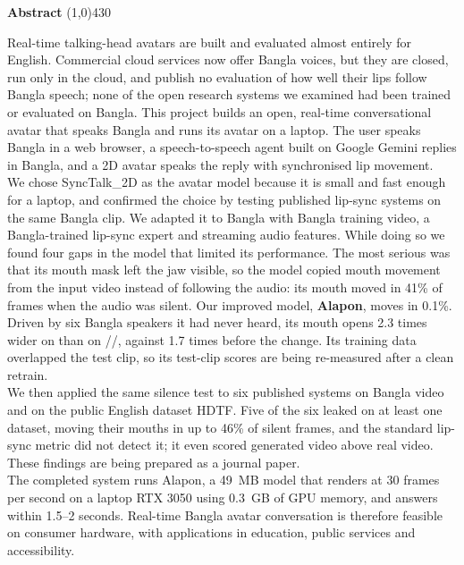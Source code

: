 \setlength{\headheight}{14pt}
\begin{center}
	{\huge \bf Abstract}
	\line(1,0){430}
\end{center}

Real-time talking-head avatars are built and evaluated almost entirely for English. Commercial cloud services now offer Bangla voices, but they are closed, run only in the cloud, and publish no evaluation of how well their lips follow Bangla speech; none of the open research systems we examined had been trained or evaluated on Bangla. This project builds an open, real-time conversational avatar that speaks Bangla and runs its avatar on a laptop. The user speaks Bangla in a web browser, a speech-to-speech agent built on Google Gemini replies in Bangla, and a 2D avatar speaks the reply with synchronised lip movement.\\

\noindent
We chose SyncTalk\_2D as the avatar model because it is small and fast enough for a laptop, and confirmed the choice by testing published lip-sync systems on the same Bangla clip. We adapted it to Bangla with Bangla training video, a Bangla-trained lip-sync expert and streaming audio features. While doing so we found four gaps in the model that limited its performance. The most serious was that its mouth mask left the jaw visible, so the model copied mouth movement from the input video instead of following the audio: its mouth moved in 41\% of frames when the audio was silent. Our improved model, \textbf{Alapon}, moves in 0.1\%. Driven by six Bangla speakers it had never heard, its mouth opens 2.3 times wider on  than on //, against 1.7 times before the change. Its training data overlapped the test clip, so its test-clip scores are being re-measured after a clean retrain.\\

\noindent
We then applied the same silence test to six published systems on Bangla video and on the public English dataset HDTF. Five of the six leaked on at least one dataset, moving their mouths in up to 46\% of silent frames, and the standard lip-sync metric did not detect it; it even scored generated video above real video. These findings are being prepared as a journal paper.\\

\noindent
The completed system runs Alapon, a 49~MB model that renders at 30 frames per second on a laptop RTX 3050 using 0.3~GB of GPU memory, and answers within 1.5--2 seconds. Real-time Bangla avatar conversation is therefore feasible on consumer hardware, with applications in education, public services and accessibility.
